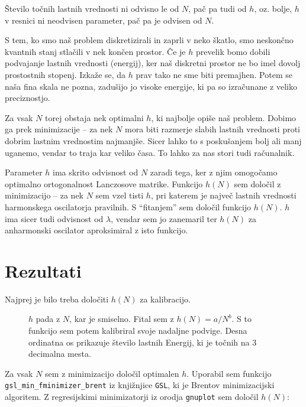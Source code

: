 \documentclass[a4 paper, 12pt]{article}
\begin{document}
Število točnih lastnih vrednosti ni odvisno le od $N$, pač pa tudi od $h$, oz. bolje, $h$ v resnici ni neodvisen parameter,
pač pa je odvisen od $N$.

S tem, ko smo naš problem diskretizirali in zaprli v neko škatlo, smo neskončno kvantnih stanj stlačili v nek končen prostor.
Če je $h$ prevelik bomo dobili podvajanje lastnih vrednosti (energij), ker naš diskretni prostor ne bo imel dovolj prostostnih
stopenj. Izkaže se, da $h$ prav tako ne sme biti premajhen. Potem se naša fina skala ne pozna, zadušijo jo visoke energije, ki
pa so izračunane z veliko preciznostjo.

Za vsak $N$ torej obstaja nek optimalni $h$, ki najbolje opiše naš problem. Dobimo ga prek minimizacije -- za nek $N$ mora biti
razmerje slabih lastnih vrednosti proti dobrim lastnim vrednostim najmanjše. Sicer lahko to s poskušanjem bolj ali manj uganemo,
vendar to traja kar veliko časa. To lahko za nas stori tudi računalnik.

Parameter $h$ ima skrito odvisnost od $N$ zaradi tega, ker z njim omogočamo optimalno ortogonalnost Lanczosove matrike. Funkcijo
$h(N)$ sem določil z minimizacijo -- za nek $N$ sem vzel tisti $h$, pri katerem je največ lastnih vrednosti harmonskega oscilatorja
pravilnih. S "`fitanjem"' sem določil funkcijo $h(N)$. $h$ ima sicer tudi odvisnost od $\lambda$, vendar sem jo zanemaril ter
$h(N)$ za anharmonski oscilator aproksimiral z isto funkcijo.

\section{Rezultati}

Najprej je bilo treba določiti $h(N)$ za kalibracijo.

\begin{figure}[H]
	\begin{center}
		
	\end{center}
	\vspace{-20pt}
	\caption{$h$ pada z $N$, kar je smiselno. Fital sem z $h(N) = a/N^b$. S to funkcijo sem potem kalibriral svoje
nadaljne podvige. Desna ordinatna os prikazuje število lastnih Energij, ki je točnih na 3 decimalna mesta.}
	\label{kalibracija}
	\vspace{-10pt}
\end{figure}

Za vsak $N$ sem z minimizacijo določil optimalen $h$. Uporabil sem funkcijo {\tt gsl\_min\_fminimizer\_brent} iz knjižnjice
{\tt GSL}, ki je Brentov minimizacijski algoritem. Z regresijskimi minimizatorji iz orodja {\tt gnuplot} sem določil $h(N)$:
\end{document}
